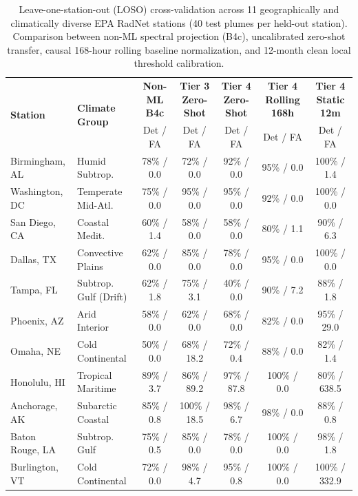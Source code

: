 \begin{table}[H]
\caption{Leave-one-station-out (LOSO) cross-validation across 11 geographically and climatically diverse EPA RadNet stations (40 test plumes per held-out station). Comparison between non-ML spectral projection (B4c), uncalibrated zero-shot transfer, causal 168-hour rolling baseline normalization, and 12-month clean local threshold calibration.}
\label{tab:loso_11station}
\centering
\footnotesize
\begin{tabularx}{\textwidth}{@{}l X c c c c c@{}}
\toprule
\multirow{2}{*}{\textbf{Station}} & \multirow{2}{*}{\textbf{Climate Group}} & \textbf{Non-ML B4c} & \textbf{Tier 3 Zero-Shot} & \textbf{Tier 4 Zero-Shot} & \textbf{Tier 4 Rolling 168h} & \textbf{Tier 4 Static 12m} \\
 & & Det / FA & Det / FA & Det / FA & Det / FA & Det / FA \\
\midrule
Birmingham, AL & Humid Subtrop. & 78\% / 0.0 & 72\% / 0.0 & 92\% / 0.0 & 95\% / 0.0 & 100\% / 1.4 \\
Washington, DC & Temperate Mid-Atl. & 75\% / 0.0 & 95\% / 0.0 & 95\% / 0.0 & 92\% / 0.0 & 100\% / 0.0 \\
San Diego, CA & Coastal Medit. & 60\% / 1.4 & 58\% / 0.0 & 58\% / 0.0 & 80\% / 1.1 & 90\% / 6.3 \\
Dallas, TX & Convective Plains & 62\% / 0.0 & 85\% / 0.0 & 78\% / 0.0 & 95\% / 0.0 & 100\% / 0.0 \\
Tampa, FL & Subtrop. Gulf (Drift) & 62\% / 1.8 & 75\% / 3.1 & 40\% / 0.0 & 90\% / 7.2 & 88\% / 1.8 \\
Phoenix, AZ & Arid Interior & 58\% / 0.0 & 62\% / 0.0 & 68\% / 0.0 & 82\% / 0.0 & 95\% / 29.0 \\
Omaha, NE & Cold Continental & 50\% / 0.0 & 68\% / 18.2 & 72\% / 0.4 & 88\% / 0.0 & 82\% / 1.4 \\
Honolulu, HI & Tropical Maritime & 89\% / 3.7 & 86\% / 89.2 & 97\% / 87.8 & 100\% / 0.0 & 80\% / 638.5 \\
Anchorage, AK & Subarctic Coastal & 85\% / 0.8 & 100\% / 18.5 & 98\% / 6.7 & 98\% / 0.0 & 88\% / 0.8 \\
Baton Rouge, LA & Subtrop. Gulf & 75\% / 0.5 & 85\% / 0.0 & 78\% / 0.0 & 100\% / 0.0 & 98\% / 1.8 \\
Burlington, VT & Cold Continental & 72\% / 0.0 & 98\% / 4.7 & 95\% / 0.8 & 100\% / 0.0 & 100\% / 332.9 \\
\bottomrule
\end{tabularx}
\end{table}
